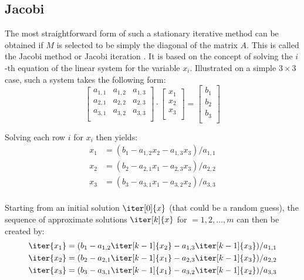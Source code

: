 \subsection{Jacobi}
The most straightforward form of such a stationary iterative method can be obtained if $M$ is selected to be simply the diagonal of the matrix $A$. This is called the Jacobi method or Jacobi iteration \cite{golub_matrix_2013}. It is based on the concept of solving the $i$-th equation of the linear system for the variable $x_i$. Illustrated on a simple $3 \times 3$ case, such a system takes the following form:
\begin{equation}
  \left[
    \begin{array}{ccc}
      a_{1,1} & a_{1,2} & a_{1,3} \\
      a_{2,1} & a_{2,2} & a_{2,3} \\
      a_{3,1} & a_{3,2} & a_{3,3} \\
    \end{array}
  \right] \cdot
  \left[
    \begin{array}{c}
      x_{1} \\
      x_{2} \\
      x_{3}  \\
    \end{array}
  \right] = 
  \left[
    \begin{array}{c}
      b_{1} \\
      b_{2} \\
      b_{3}  \\
    \end{array}
  \right] 
\end{equation}

\noindent Solving each row $i$ for $x_i$ then yields:
\begin{equation}
   \begin{aligned}
    x_1 & =  (b_1 -a_{1,2}x_2 - a_{1,3}x_3)/a_{1,1} \\
    x_2 & =  (b_2 -a_{2,1}x_1 - a_{2,3}x_3)/a_{2,2} \\
    x_3 & =  (b_3 -a_{3,1}x_1 - a_{3,2}x_2)/a_{3,3} \\
\end{aligned} 
\end{equation}

\noindent Starting from an initial solution $\iter[0]{x}$ (that could be a random guess), the sequence of approximate solutions $\iter[k]{x}$ for $ = 1,2, \dots, m$ can then be created by:
\begin{equation}
\label{eqn:jacobi_3x3}
   \begin{aligned}
    \iter{x_1} & =  (b_1 -a_{1,2}\iter[k-1]{x_2} - a_{1,3}\iter[k-1]{x_3})/a_{1,1} \\
    \iter{x_2} & =  (b_2 -a_{2,1}\iter[k-1]{x_1} - a_{2,3}\iter[k-1]{x_3})/a_{2,2} \\
    \iter{x_3} & =  (b_3 -a_{3,1}\iter[k-1]{x_1} - a_{3,2}\iter[k-1]{x_2})/a_{3,3} \\
\end{aligned} 
\end{equation}

